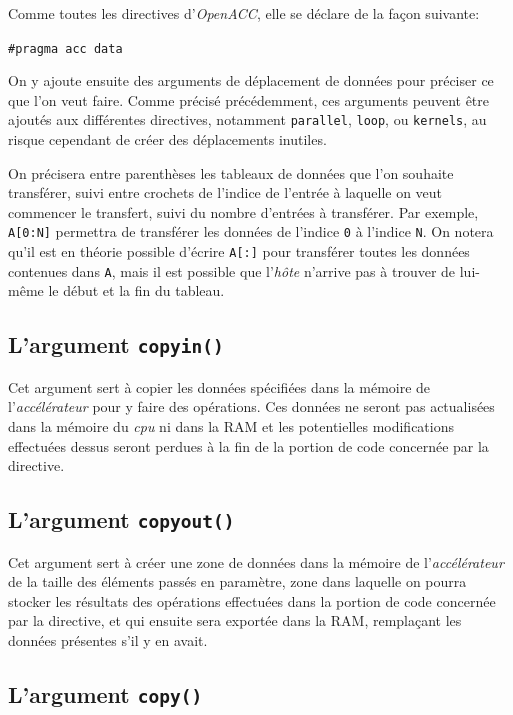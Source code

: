 \documentclass{article}
\begin{document}
Comme toutes les directives d'\textit{OpenACC}, elle se déclare de la façon suivante:

\texttt{\#pragma acc data}

On y ajoute ensuite des arguments de déplacement de données pour préciser ce que l'on veut faire. Comme précisé précédemment, ces arguments peuvent être ajoutés aux différentes directives, notamment \texttt{parallel}, \texttt{loop}, ou \texttt{kernels}, au risque cependant de créer des déplacements inutiles.

On précisera entre parenthèses les tableaux de données que l'on souhaite transférer, suivi entre crochets de l'indice de l'entrée à laquelle on veut commencer le transfert, suivi du nombre d'entrées à transférer. Par exemple, \texttt{A[0:N]} permettra de transférer les données de l'indice \texttt{0} à l'indice \texttt{N}. On notera qu'il est en théorie possible d'écrire \texttt{A[:]} pour transférer toutes les données contenues dans \texttt{A}, mais il est possible que l'\textit{hôte} n'arrive pas à trouver de lui-même le début et la fin du tableau.

\subsection{L'argument \texttt{copyin()}}

Cet argument sert à copier les données spécifiées dans la mémoire de l'\textit{accélérateur} pour y faire des opérations. Ces données ne seront pas actualisées dans la mémoire du \textit{\gls{cpu}} ni dans la RAM et les potentielles modifications effectuées dessus seront perdues à la fin de la portion de code concernée par la directive.

\subsection{L'argument \texttt{copyout()}}

Cet argument sert à créer une zone de données dans la mémoire de l'\textit{accélérateur} de la taille des éléments passés en paramètre, zone dans laquelle on pourra stocker les résultats des opérations effectuées dans la portion de code concernée par la directive, et qui ensuite sera exportée dans la RAM, remplaçant les données présentes s'il y en avait. 

\subsection{L'argument \texttt{copy()}}
\end{document}
